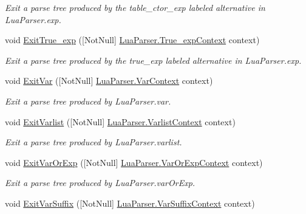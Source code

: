 \begin{DoxyCompactItemize}
\begin{DoxyCompactList}\small\item\em Exit a parse tree produced by the {\ttfamily table\+\_\+ctor\+\_\+exp} labeled alternative in Lua\+Parser.\+exp. \end{DoxyCompactList}\item 
void \mbox{\hyperlink{classzlua_1_1_compiler_a4f3853e4033fb51cb2d9c63cdd66e1ae}{Exit\+True\+\_\+exp}} (\mbox{[}Not\+Null\mbox{]} \mbox{\hyperlink{classzlua_1_1_lua_parser_1_1_true__exp_context}{Lua\+Parser.\+True\+\_\+exp\+Context}} context)
\begin{DoxyCompactList}\small\item\em Exit a parse tree produced by the {\ttfamily true\+\_\+exp} labeled alternative in Lua\+Parser.\+exp. \end{DoxyCompactList}\item 
void \mbox{\hyperlink{classzlua_1_1_compiler_ac7ccb4c59166208993e3a32b470cc7bf}{Exit\+Var}} (\mbox{[}Not\+Null\mbox{]} \mbox{\hyperlink{classzlua_1_1_lua_parser_1_1_var_context}{Lua\+Parser.\+Var\+Context}} context)
\begin{DoxyCompactList}\small\item\em Exit a parse tree produced by Lua\+Parser.\+var. \end{DoxyCompactList}\item 
void \mbox{\hyperlink{classzlua_1_1_compiler_aeec0bb5231adbd6068558564536bc95e}{Exit\+Varlist}} (\mbox{[}Not\+Null\mbox{]} \mbox{\hyperlink{classzlua_1_1_lua_parser_1_1_varlist_context}{Lua\+Parser.\+Varlist\+Context}} context)
\begin{DoxyCompactList}\small\item\em Exit a parse tree produced by Lua\+Parser.\+varlist. \end{DoxyCompactList}\item 
void \mbox{\hyperlink{classzlua_1_1_compiler_abdab8a4aa0e213706786e7238295259a}{Exit\+Var\+Or\+Exp}} (\mbox{[}Not\+Null\mbox{]} \mbox{\hyperlink{classzlua_1_1_lua_parser_1_1_var_or_exp_context}{Lua\+Parser.\+Var\+Or\+Exp\+Context}} context)
\begin{DoxyCompactList}\small\item\em Exit a parse tree produced by Lua\+Parser.\+var\+Or\+Exp. \end{DoxyCompactList}\item 
void \mbox{\hyperlink{classzlua_1_1_compiler_aae7819794cccd6cfa7ccedcdb6c69a78}{Exit\+Var\+Suffix}} (\mbox{[}Not\+Null\mbox{]} \mbox{\hyperlink{classzlua_1_1_lua_parser_1_1_var_suffix_context}{Lua\+Parser.\+Var\+Suffix\+Context}} context)

\end{DoxyCompactItemize}
